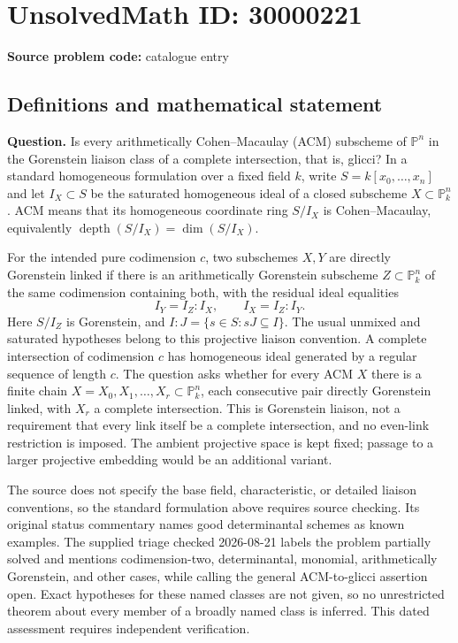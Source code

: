 \documentclass[11pt]{article}
\newcommand{\PP}{\mathbb{P}}
\begin{document}
\section*{UnsolvedMath ID: 30000221}
\textbf{Source problem code:} catalogue entry
\subsection{Definitions and mathematical statement}
\textbf{Question.} Is every arithmetically Cohen--Macaulay (ACM) subscheme of \(\PP^n\) in the Gorenstein liaison class of a complete intersection, that is, glicci? In a standard homogeneous formulation over a fixed field \(k\), write \(S=k[x_0,\ldots,x_n]\) and let \(I_X\subset S\) be the saturated homogeneous ideal of a closed subscheme \(X\subset\PP^n_k\). ACM means that its homogeneous coordinate ring \(S/I_X\) is Cohen--Macaulay, equivalently \(\operatorname{depth}(S/I_X)=\dim(S/I_X)\).\par For the intended pure codimension \(c\), two subschemes \(X,Y\) are directly Gorenstein linked if there is an arithmetically Gorenstein subscheme \(Z\subset\PP^n_k\) of the same codimension containing both, with the residual ideal equalities\[I_Y=I_Z:I_X,\qquad I_X=I_Z:I_Y.\] Here \(S/I_Z\) is Gorenstein, and \(I:J=\{s\in S:sJ\subseteq I\}\). The usual unmixed and saturated hypotheses belong to this projective liaison convention. A complete intersection of codimension \(c\) has homogeneous ideal generated by a regular sequence of length \(c\). The question asks whether for every ACM \(X\) there is a finite chain \(X=X_0,X_1,\ldots,X_r\subset\PP^n_k\), each consecutive pair directly Gorenstein linked, with \(X_r\) a complete intersection. This is Gorenstein liaison, not a requirement that every link itself be a complete intersection, and no even-link restriction is imposed. The ambient projective space is kept fixed; passage to a larger projective embedding would be an additional variant.\par The source does not specify the base field, characteristic, or detailed liaison conventions, so the standard formulation above requires source checking. Its original status commentary names good determinantal schemes as known examples. The supplied triage checked 2026-08-21 labels the problem partially solved and mentions codimension-two, determinantal, monomial, arithmetically Gorenstein, and other cases, while calling the general ACM-to-glicci assertion open. Exact hypotheses for these named classes are not given, so no unrestricted theorem about every member of a broadly named class is inferred. This dated assessment requires independent verification.
\end{document}
